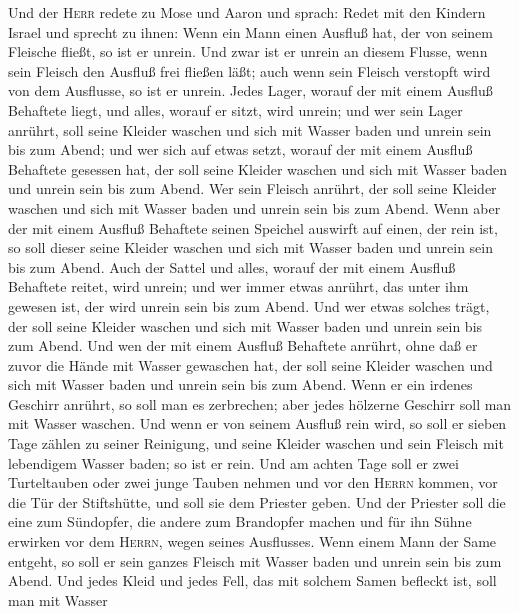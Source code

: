  Und der \textsc{Herr} redete zu Mose und Aaron und
sprach:  Redet mit den Kindern Israel und sprecht zu
ihnen: Wenn ein Mann einen Ausfluß hat, der von seinem Fleische fließt,
so ist er unrein.  Und zwar ist er unrein an diesem
Flusse, wenn sein Fleisch den Ausfluß frei fließen läßt; auch wenn sein
Fleisch verstopft wird von dem Ausflusse, so ist er unrein.
 Jedes Lager, worauf der mit einem Ausfluß Behaftete
liegt, und alles, worauf er sitzt, wird unrein;  und wer
sein Lager anrührt, soll seine Kleider waschen und sich mit Wasser baden
und unrein sein bis zum Abend;  und wer sich auf etwas
setzt, worauf der mit einem Ausfluß Behaftete gesessen hat, der soll
seine Kleider waschen und sich mit Wasser baden und unrein sein bis zum
Abend.  Wer sein Fleisch anrührt, der soll seine Kleider
waschen und sich mit Wasser baden und unrein sein bis zum Abend.
 Wenn aber der mit einem Ausfluß Behaftete seinen Speichel
auswirft auf einen, der rein ist, so soll dieser seine Kleider waschen
und sich mit Wasser baden und unrein sein bis zum Abend. 
Auch der Sattel und alles, worauf der mit einem Ausfluß Behaftete
reitet, wird unrein;  und wer immer etwas anrührt, das
unter ihm gewesen ist, der wird unrein sein bis zum Abend. Und wer etwas
solches trägt, der soll seine Kleider waschen und sich mit Wasser baden
und unrein sein bis zum Abend.  Und wen der mit einem
Ausfluß Behaftete anrührt, ohne daß er zuvor die Hände mit Wasser
gewaschen hat, der soll seine Kleider waschen und sich mit Wasser baden
und unrein sein bis zum Abend.  Wenn er ein irdenes
Geschirr anrührt, so soll man es zerbrechen; aber jedes hölzerne
Geschirr soll man mit Wasser waschen.  Und wenn er von
seinem Ausfluß rein wird, so soll er sieben Tage zählen zu seiner
Reinigung, und seine Kleider waschen und sein Fleisch mit lebendigem
Wasser baden; so ist er rein.  Und am achten Tage soll er
zwei Turteltauben oder zwei junge Tauben nehmen und vor den
\textsc{Herrn} kommen, vor die Tür der Stiftshütte, und soll sie dem
Priester geben.  Und der Priester soll die eine zum
Sündopfer, die andere zum Brandopfer machen und für ihn Sühne erwirken
vor dem \textsc{Herrn}, wegen seines Ausflusses.  Wenn
einem Mann der Same entgeht, so soll er sein ganzes Fleisch mit Wasser
baden und unrein sein bis zum Abend.  Und jedes Kleid und
jedes Fell, das mit solchem Samen befleckt ist, soll man mit Wasser
